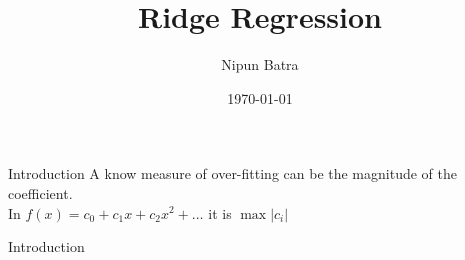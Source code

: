 \documentclass{beamer}
\title{Ridge Regression}
\date{\today}
\author{Nipun Batra}
\institute{IIT Gandhinagar}
\begin{document}
  \maketitle

\begin{frame}{Introduction}
A know measure of over-fitting can be the magnitude of the coefficient. \\ \bigskip
\pause
In $f(x) = c_0 + c_1x + c_2x^2 + \dots$ it is $\max|c_i|$ \\ \bigskip
\end{frame}
  
\begin{frame}{Introduction}
\vspace{0.4cm}

\end{frame}
\end{document}
